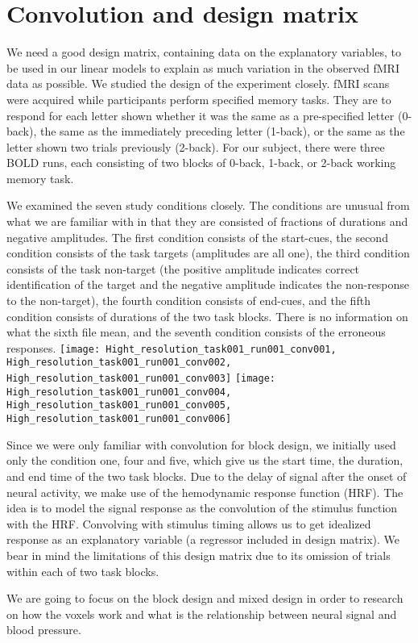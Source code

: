 \section{Convolution and design matrix}

We need a good design matrix, containing data on the explanatory variables, to
be used in our linear models to explain as much variation in the observed fMRI
data as possible. We studied the design of the experiment closely. fMRI scans were
acquired while participants perform specified memory tasks. They are to respond
for each letter shown whether it was the same as a pre-specified letter
(0-back), the same as the immediately preceding letter (1-back), or the same as
the letter shown two trials previously (2-back). For our subject, there were
three BOLD runs, each consisting of two blocks of 0-back, 1-back, or 2-back
working memory task. 

We examined the seven study conditions closely. The conditions are unusual from
what we are familiar with in that they are consisted of fractions of durations
and negative amplitudes. The first condition consists of
the start-cues, the second condition consists of the task targets (amplitudes
are all one), the third condition consists of the task non-target (the positive amplitude indicates
correct identification of the target and the negative amplitude indicates the
non-response to the non-target), the fourth condition consists of end-cues, and
the fifth condition consists of durations of the two task blocks. There is no
information on what the sixth file mean, and the seventh condition consists of
the erroneous responses.
\texttt{[image: Hight\_resolution\_task001\_run001\_conv001, High\_resolution\_task001\_run001\_conv002,
High\_resolution\_task001\_run001\_conv003]}
\texttt{[image: High\_resolution\_task001\_run001\_conv004, High\_resolution\_task001\_run001\_conv005,
High\_resolution\_task001\_run001\_conv006]}
\label{Convolution Response from 6 Condition} 

Since we were only familiar with convolution for block design, we initially used
only the condition one, four and five, which give us the start time, the
duration, and end time of the two task blocks. Due to the delay of signal after
the onset of neural activity, we make use of the hemodynamic response
function (HRF). The idea is to model the signal response as the convolution of
the stimulus function with the HRF. Convolving with stimulus timing allows us to
get idealized response as an explanatory variable (a regressor included in
design matrix). We bear in mind the limitations of this
design matrix due to its omission of trials within each of two task blocks. 

\label{combination of block design and mixed design}

We are going to focus on the block design and mixed design in order to research
on how the voxels work and what is the relationship between neural signal and 
blood pressure.
